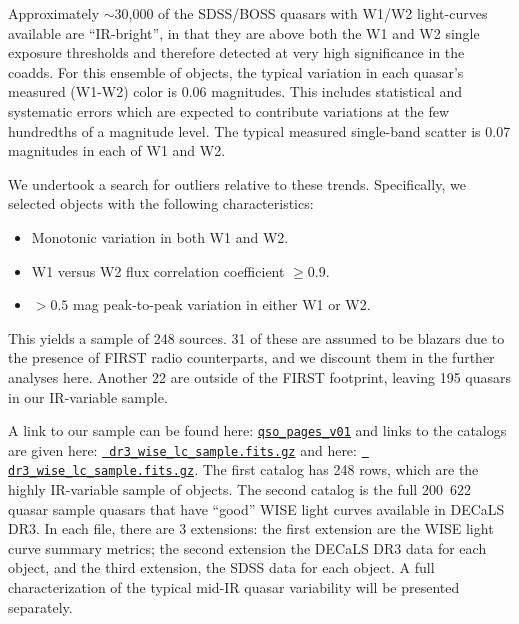 \documentclass[11pt,a4paper]{article}
\begin{document}
Approximately $\sim$30,000 of the SDSS/BOSS quasars with W1/W2
light-curves available are ``IR-bright'', in that they are above both
the W1 and W2 single exposure thresholds and therefore detected at
very high significance in the coadds. For this ensemble of objects,
the typical variation in each quasar's measured (W1-W2) color is 0.06
magnitudes.  This includes statistical and systematic errors which are
expected to contribute variations at the few hundredths of a magnitude
level. The typical measured single-band scatter is 0.07 magnitudes in
each of W1 and W2.

We undertook a search for outliers relative to these trends.
Specifically, we selected objects with the following characteristics:
\begin{itemize}
    \item Monotonic variation in both W1 and W2.
    \item W1 versus W2 flux correlation coefficient $\geq0.9$.
    \item $>0.5$ mag peak-to-peak variation in either W1 or W2.
\end{itemize}
This yields a sample of 248 sources. 31 of these are assumed to be
blazars due to the presence of FIRST radio counterparts, and we
discount them in the further analyses here. Another 22 are outside of
the FIRST footprint, leaving 195 quasars in our IR-variable sample.

A link to our sample can be found here:
\href{http://portal.nersc.gov/project/cosmo/temp/ameisner/qso\_pages\_v01/}
{\tt qso\_pages\_v01} and links to the catalogs are given here:
\href{http://portal.nersc.gov/project/cosmo/temp/ameisner/dr3_wise_lc_sample.fits.gz}{{\tt
dr3\_wise\_lc\_sample.fits.gz}} and here:
\href{http://portal.nersc.gov/project/cosmo/temp/ameisner/dr3_wise_lc_metrics_all_qso.fits.gz}{{\tt
dr3\_wise\_lc\_sample.fits.gz}}.  The first catalog has 248 rows,
which are the highly IR-variable sample of objects.  The second
catalog is the full \hbox{200 622} quasar sample quasars that have
``good'' WISE light curves available in DECaLS DR3. In each file,
there are 3 extensions: the first extension are the WISE light curve
summary metrics; the second extension the DECaLS DR3 data for each
object, and the third extension, the SDSS data for each object.  A full
characterization of the typical mid-IR quasar variability will be
presented separately.
\end{document}
